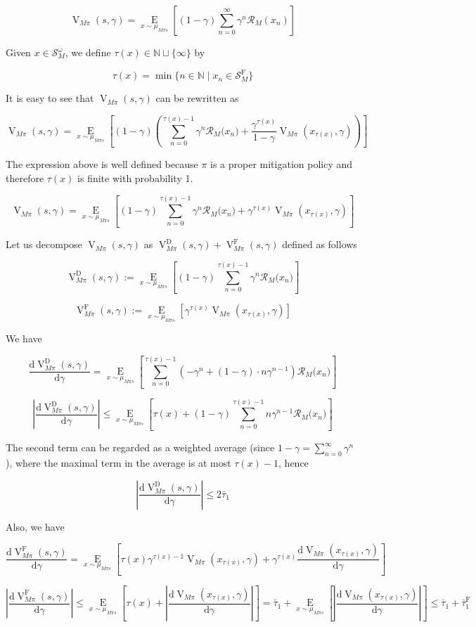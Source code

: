 \documentclass[a4paper]{article}
\newcommand{\AP}[1]{\left(#1\right)}
\newcommand{\AB}[1]{\left[#1\right]}
\newcommand{\Ea}[2]{\underset{#1}{\operatorname{E}}\AB{#2}}
\newcommand{\D}{\mathrm{d}}
\newcommand{\Nats}{\mathbb{N}}
\newcommand{\Abs}[1]{\left\vert #1 \right\vert}
\newcommand{\St}{\mathcal{S}}
\newcommand{\R}{\mathcal{R}}
\newcommand{\RMD}{\mathrm{D}}
\newcommand{\RMF}{\mathrm{F}}
\newcommand{\SF}{\St^{\RMF}}
\newcommand{\TF}{\bar{\tau}^{\RMF}}
\newcommand{\V}{\operatorname{V}}
\begin{document}
$$\V_{M\pi}(s,\gamma) = \Ea{x\sim\mu_{M\pi s}}{(1-\gamma)\sum_{n=0}^\infty \gamma^n \R_M\AP{x_n}}$$

Given $x\in\St_M^\omega$, we define $\tau(x) \in \Nats \sqcup \{\infty\}$ by 

$$\tau(x)=\min\{n \in \Nats \mid x_n \in \SF_M\}$$

It is easy to see that $\V_{M\pi}(s,\gamma)$ can be rewritten as

$$\V_{M\pi}(s,\gamma) = \Ea{x\sim\mu_{M\pi s}}{(1-\gamma)\AP{\sum_{n=0}^{\tau(x)-1} \gamma^n \R_M\Big(x_n\Big) + \frac{\gamma^{\tau(x)}}{1-\gamma}\V_{M\pi}\AP{x_{\tau(x)},\gamma}}}$$

The expression above is well defined because $\pi$ is a proper mitigation policy and therefore $\tau(x)$ is finite with probability 1.

$$\V_{M\pi}(s,\gamma) = \Ea{x\sim\mu_{M\pi s}}{(1-\gamma)\sum_{n=0}^{\tau(x)-1} \gamma^n \R_M\Big(x_n\Big) + \gamma^{\tau(x)}\V_{M\pi}\AP{x_{\tau(x)},\gamma}}$$

Let us decompose $\V_{M\pi}(s,\gamma)$ as $\V_{M\pi}^\RMD(s,\gamma)+\V_{M\pi}^\RMF(s,\gamma)$ defined as follows

$$\V_{M\pi}^\RMD(s,\gamma) := \Ea{x\sim\mu_{M\pi s}}{(1-\gamma)\sum_{n=0}^{\tau(x)-1} \gamma^n \R_M\Big(x_n\Big) }$$

$$\V_{M\pi}^\RMF(s,\gamma) := \Ea{x\sim\mu_{M\pi s}}{\gamma^{\tau(x)}\V_{M\pi}\AP{x_{\tau(x)},\gamma}}$$

We have

$$\frac{\D\V_{M\pi}^\RMD(s,\gamma)}{\D\gamma} = \Ea{x\sim\mu_{M\pi s}}{\sum_{n=0}^{\tau(x)-1} \AP{-\gamma^n+(1-\gamma)\cdot n\gamma^{n-1}} \R_M\Big(x_n\Big)}$$

$$\Abs{\frac{\D\V_{M\pi}^\RMD(s,\gamma)}{\D\gamma}} \leq \Ea{x\sim\mu_{M\pi s}}{\tau(x)+(1-\gamma)\sum_{n=0}^{\tau(x)-1} n\gamma^{n-1} \R_M\Big(x_n\Big) }$$

The second term can be regarded as a weighted average (since $1-\gamma=\sum_{n=0}^\infty \gamma^n$), where the maximal term in the average is at most $\tau(x)-1$, hence

$$\Abs{\frac{\D\V_{M\pi}^\RMD(s,\gamma)}{\D\gamma}} \leq 2 \bar{\tau}_1$$

Also, we have

$$\frac{\D\V_{M\pi}^\RMF(s,\gamma)}{\D\gamma} = \Ea{x\sim\mu_{M\pi s}}{\tau(x)\gamma^{\tau(x)-1}\V_{M\pi}\AP{x_{\tau(x)},\gamma}+\gamma^{\tau(x)}\frac{\D\V_{M\pi}\AP{x_{\tau(x)},\gamma}}{\D\gamma}}$$

$$\Abs{\frac{\D\V_{M\pi}^\RMF(s,\gamma)}{\D\gamma}} \leq \Ea{x\sim\mu_{M\pi s}}{ \tau(x)+\Abs{\frac{\D\V_{M\pi}\AP{x_{\tau(x)},\gamma}}{\D\gamma}}} = \bar{\tau}_1 + \Ea{x\sim\mu_{M\pi s}}{\Abs{\frac{\D\V_{M\pi}\AP{x_{\tau(x)},\gamma}}{\D\gamma}}} \leq \bar{\tau}_1 + \TF_1$$
\end{document}
